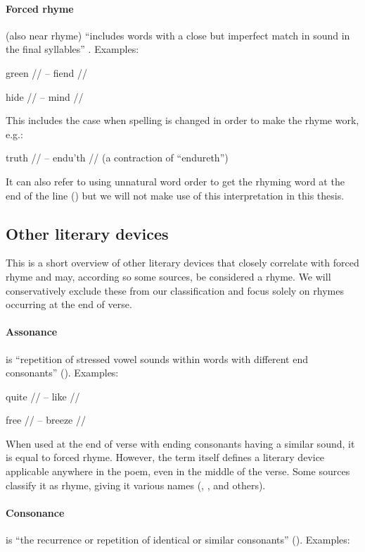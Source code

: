 \paragraph{Forced rhyme} (also near rhyme) ``includes words with a close but imperfect match in sound in the final syllables'' \cite{bergman2017litcharts}. Examples: 

green // -- fiend //

hide // -- mind //

\noindent This includes the case when spelling is changed in order to make the rhyme work, e.g.:

 truth // -- endu'th // (a contraction of ``endureth'')
 
 It can also refer to using unnatural word order to get the rhyming word at the end of the line (\cite{bergman2017litcharts}) but we will not make use of this interpretation in this thesis.

\subsection{Other literary devices}
This is a short overview of other literary devices that closely correlate with forced rhyme and may, according so some sources, be considered a rhyme. We will conservatively exclude these from our classification and focus solely on rhymes occurring at the end of verse.

\paragraph{Assonance} is ``repetition of stressed vowel sounds within words with different end consonants'' (\cite{britannica}). Examples:	

quite // -- like //

free // -- breeze //

\noindent When used at the end of verse with ending consonants having a similar sound, it is equal to forced rhyme. However, the term itself defines a literary device applicable anywhere in the poem, even in the middle of the verse. Some sources classify it as rhyme, giving it various names (\cite{vanphonological}, \cite{bergman2017litcharts}, and others).

\paragraph{Consonance} is ``the recurrence or repetition of identical or similar consonants'' (\cite{britannica}). Examples: 

